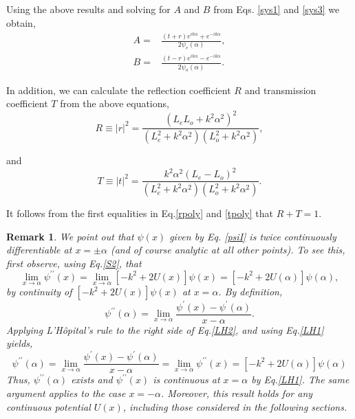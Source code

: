 \documentclass{article}
\newtheorem{remark}{Remark}
\numberwithin{equation}{section}
\begin{document}
Using the above results and solving for $A$ and $B$ from Eqs. \eqref{sys1} and \eqref{sys3} we obtain,
\begin{align}
A =& \frac{(t+r)e^{ik\alpha} +e^{-ik\alpha}}{2\psi_e(\alpha)},\label{A}\\
B =& \frac{(t-r)e^{ik\alpha} -e^{-ik\alpha}}{2\psi_o(\alpha)}.\label{B}
\end{align}

In addition, we can calculate the reflection coefficient $R$ and transmission coefficient $T$ from the above equations, 
\begin{equation}
R \equiv |r|^2=\frac{(L_{\displaystyle e} L_{\displaystyle o} + k^2\alpha^2)^2}{\left(L_{\displaystyle e}^2+k^2\alpha^2\right)
   \left(L_{\displaystyle o}^2+k^2\alpha^2\right)},\label{rpoly}
\end{equation}

and 
\begin{equation}
T\equiv |t|^2=\frac{k^2\alpha^2(L_{\displaystyle e} - L_{\displaystyle o})^2}{{\left(L_{\displaystyle e}^2+k^2\alpha^2\right)
   \left(L_{\displaystyle o}^2+k^2\alpha^2\right)}}.\label{tpoly}
\end{equation}

It follows from the first equalities in Eq.\eqref{rpoly} and \eqref{tpoly} that $R+T=1$.\\

\begin{remark}\label{C2}
We point out that $\psi(x)$ given by Eq. \eqref{psiI} is twice continuously differentiable at $x=\pm\alpha$ (and of course analytic at all other points).  To see this, first observe, using Eq.\eqref{S2}, that
\begin{equation}\label{LH1}
\lim_{x\to\alpha}\psi^{\prime\prime}(x)=\lim_{x\to\alpha}\left[-k^2+2U(x)\right]\psi(x)=\left[-k^2+2U(\alpha)\right]\psi(\alpha),
\end{equation}
by continuity of $\left[-k^2+2U(x)\right]\psi(x)$ at $x=\alpha$.  By definition,
\begin{equation}\label{LH2}
\psi^{\prime\prime}(\alpha)=\lim_{x\to\alpha}\frac{\psi^{\prime}(x)-\psi^{\prime}(\alpha)}{x-\alpha}.
\end{equation}
Applying L'H\^opital's rule to the right side of Eq.\eqref{LH2}, and using Eq.\eqref{LH1} yields,
\begin{equation}
\psi^{\prime\prime}(\alpha)=\lim_{x\to\alpha}\frac{\psi^{\prime}(x)-\psi^{\prime}(\alpha)}{x-\alpha}=\lim_{x\to\alpha}\psi^{\prime\prime}(x)=\left[-k^2+2U(\alpha)\right]\psi(\alpha)
\end{equation}
Thus, $\psi^{\prime\prime}(\alpha)$ exists and $\psi^{\prime\prime}(x)$ is continuous at $x=\alpha$ by Eq.\eqref{LH1}.  The same argument applies to the case $x=-\alpha$.  Moreover, this result holds for any continuous potential $U(x)$, including those considered in the following sections.
\end{remark}
\end{document}

